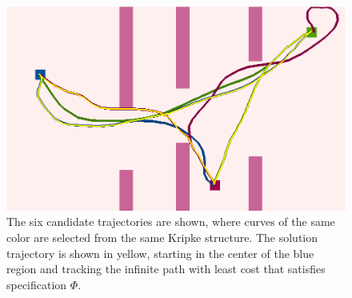 \begin{figure}
    \centering
    \includegraphics[scale=0.61]{./figures/doubleint2-good-lqr.png}
    \caption[Double Integrator Example --- Simulation Results]{The six candidate trajectories are shown, where curves of the same color are selected from the same Kripke structure. The solution trajectory is shown in yellow, starting in the center of the blue region and tracking the infinite path with least cost that satisfies specification $\Phi$.} 
\label{fig:sol}
\end{figure}


   
